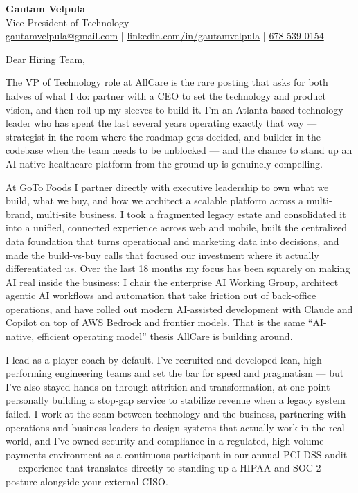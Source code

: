\documentclass[11pt]{article}
\begin{document}
\begin{center}
    {\LARGE \textbf{Gautam Velpula}} \\[4pt]
    Vice President of Technology \\[6pt]
    \href{mailto:gautamvelpula@gmail.com}{gautamvelpula@gmail.com} \;|\;
    \href{https://www.linkedin.com/in/gautamvelpula}{linkedin.com/in/gautamvelpula} \;|\;
    \href{tel:6785390154}{678-539-0154}
\end{center}

\hrulefill

\vspace{12pt}

Dear Hiring Team,

The VP of Technology role at AllCare is the rare posting that asks for both halves of what I do: partner with a CEO to set the technology and product vision, and then roll up my sleeves to build it. I'm an Atlanta-based technology leader who has spent the last several years operating exactly that way --- strategist in the room where the roadmap gets decided, and builder in the codebase when the team needs to be unblocked --- and the chance to stand up an AI-native healthcare platform from the ground up is genuinely compelling.

At GoTo Foods I partner directly with executive leadership to own what we build, what we buy, and how we architect a scalable platform across a multi-brand, multi-site business. I took a fragmented legacy estate and consolidated it into a unified, connected experience across web and mobile, built the centralized data foundation that turns operational and marketing data into decisions, and made the build-vs-buy calls that focused our investment where it actually differentiated us. Over the last 18 months my focus has been squarely on making AI real inside the business: I chair the enterprise AI Working Group, architect agentic AI workflows and automation that take friction out of back-office operations, and have rolled out modern AI-assisted development with Claude and Copilot on top of AWS Bedrock and frontier models. That is the same ``AI-native, efficient operating model'' thesis AllCare is building around.

I lead as a player-coach by default. I've recruited and developed lean, high-performing engineering teams and set the bar for speed and pragmatism --- but I've also stayed hands-on through attrition and transformation, at one point personally building a stop-gap service to stabilize revenue when a legacy system failed. I work at the seam between technology and the business, partnering with operations and business leaders to design systems that actually work in the real world, and I've owned security and compliance in a regulated, high-volume payments environment as a continuous participant in our annual PCI DSS audit --- experience that translates directly to standing up a HIPAA and SOC 2 posture alongside your external CISO.
\end{document}
